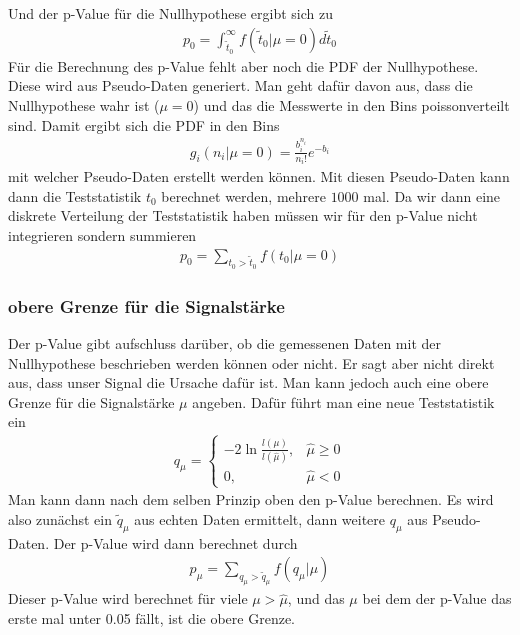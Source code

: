 Und der p-Value für die Nullhypothese ergibt sich zu
\begin{gather}
	p_{0} = \int_{\tilde{t}_{0}}^{\infty} f(\tilde{t}_{0} | \mu = 0) d\tilde{t}_{0}
\end{gather}
Für die Berechnung des p-Value fehlt aber noch die PDF der Nullhypothese.
Diese wird aus Pseudo-Daten generiert.
Man geht dafür davon aus, dass die Nullhypothese wahr ist ($\mu = 0$) und das die Messwerte in den Bins poissonverteilt sind.
Damit ergibt sich die PDF in den Bins
\begin{gather}
	g_{i}(n_{i} | \mu = 0) = \frac{b_{i}^{n_{i}}}{n_{i}!} e^{-b_{i}}
\end{gather}
mit welcher Pseudo-Daten erstellt werden können.
Mit diesen Pseudo-Daten kann dann die Teststatistik $t_{0}$ berechnet werden, mehrere $1000$ mal.
Da wir dann eine diskrete Verteilung der Teststatistik haben müssen wir für den p-Value nicht integrieren sondern summieren
\begin{gather}
	p_{0} = \sum_{t_{0} > \tilde{t}_{0}} f(t_{0}|\mu = 0)
\end{gather}

\subsubsection{obere Grenze für die Signalstärke}
Der p-Value gibt aufschluss darüber, ob die gemessenen Daten mit der Nullhypothese beschrieben werden können oder nicht.
Er sagt aber nicht direkt aus, dass unser Signal die Ursache dafür ist.
Man kann jedoch auch eine obere Grenze für die Signalstärke $\mu$ angeben.
Dafür führt man eine neue Teststatistik ein
\begin{gather}
	q_{\mu} =
	\begin{cases}
		-2 \ln{\frac{l(\mu)}{l(\hat{\mu})}}, & \hat{\mu} \geq 0 \\
		0, & \hat{\mu} < 0
	\end{cases}
\end{gather}
Man kann dann nach dem selben Prinzip oben den p-Value berechnen.
Es wird also zunächst ein $\tilde{q}_{\mu}$ aus echten Daten ermittelt, dann weitere $q_{\mu}$ aus Pseudo-Daten.
Der p-Value wird dann berechnet durch
\begin{gather}
	p_{\mu} = \sum_{q_{\mu} > \tilde{q}_{\mu}} f(q_{\mu}|\mu)
\end{gather}
Dieser p-Value wird berechnet für viele $\mu > \hat{\mu}$, und das $\mu$ bei dem der p-Value das erste mal unter \num{0.05} fällt, ist die obere Grenze.

